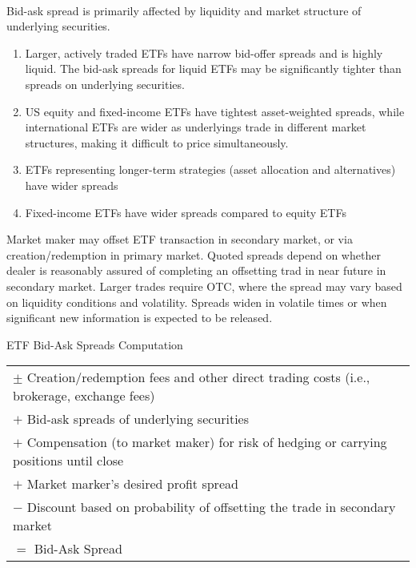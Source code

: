 \begin{remark} \\
Bid-ask spread is primarily affected by liquidity and market structure of underlying securities.
\begin{enumerate}[label=\roman*.]
\setlength{\itemsep}{0pt}
\item Larger, actively traded ETFs have narrow bid-offer spreads and is highly liquid. The bid-ask spreads for liquid ETFs may be significantly tighter than spreads on underlying securities.
\item US equity and fixed-income ETFs have tightest asset-weighted spreads, while international ETFs are wider as underlyings trade in different market structures, making it difficult to price simultaneously. 
\item ETFs representing longer-term strategies (asset allocation and alternatives) have wider spreads
\item Fixed-income ETFs have wider spreads compared to equity ETFs
\end{enumerate}
Market maker may offset ETF transaction in secondary market, or via creation/redemption in primary market. Quoted spreads depend on whether dealer is reasonably assured of completing an offsetting trad in near future in secondary market. Larger trades require OTC, where the spread may vary based on liquidity conditions and volatility. Spreads widen in volatile times or when significant new information is expected to be released.
\end{remark}

\begin{flushleft}
ETF Bid-Ask Spreads Computation
\begin{tabularx}{\textwidth}{X}
\hline
$\pm$ Creation/redemption fees and other direct trading costs (i.e., brokerage, exchange fees)\\
$+$ Bid-ask spreads of underlying securities\\
$+$ Compensation (to market maker) for risk of hedging or carrying positions until close\\
$+$ Market marker's desired profit spread\\
$-$ Discount based on probability of offsetting the trade in secondary market \\
\hline
$=$ Bid-Ask Spread \\
\hline
\end{tabularx}
\end{flushleft}

